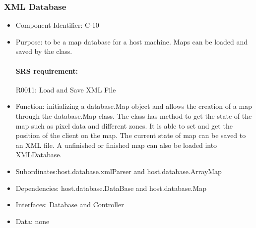 \documentclass[11pt, a4paper]{report}
\begin{document}
\subsubsection{XML Database}
\begin{itemize}
\item Component Identifier: C-10
\item Purpose: to be a map database for a host machine. Maps can be loaded and saved by the 
class. 
\paragraph{SRS requirement:} R0011: Load and Save XML File
\item Function: initializing a  database.Map object and allows the creation of a map through
the database.Map class. The class has method to get the state of the map such as pixel data and
different zones. It is able to set and get the position of the client on the map. The current state
of map can be saved to an XML file. A unfinished or finished map can also be loaded into XMLDatabase. 
\item Subordinates:host.database.xmlParser and host.database.ArrayMap
\item Dependencies: host.database.DataBase and host.database.Map
\item Interfaces: Database and Controller
\item Data: none
\end{itemize}

\end{document}
